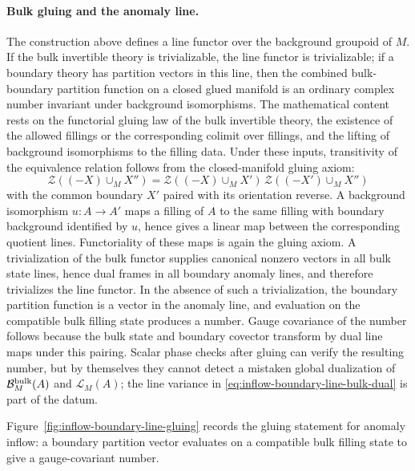 \paragraph{Bulk gluing and the anomaly line.}
The construction above defines a line functor over the background groupoid of
\(M\).  If the bulk invertible theory is trivializable, the line functor is
trivializable; if a boundary theory has partition vectors in this line, then
the combined bulk-boundary partition function on a closed glued manifold is
an ordinary complex number invariant under background isomorphisms.
The mathematical content rests on the functorial gluing law of the bulk
invertible theory, the existence of the allowed fillings or the corresponding
colimit over fillings, and the lifting of background isomorphisms to the
filling data.  Under these inputs, transitivity of the equivalence relation
follows from the closed-manifold
gluing axiom:
\[
  \mathcal Z((-X)\cup_M X'')=
  \mathcal Z((-X)\cup_M X')\,
  \mathcal Z((-X')\cup_M X'')
\]
with the common boundary \(X'\) paired with its orientation reverse.  A
background isomorphism \(u:A\to A'\) maps a filling of \(A\) to the same
filling with boundary background identified by \(u\), hence gives a linear
map between the corresponding quotient lines.  Functoriality of these maps is
again the gluing axiom.  A trivialization of the bulk functor supplies
canonical nonzero vectors in all bulk state lines, hence dual frames in all
boundary anomaly lines, and therefore trivializes the line
functor.  In the absence of such a trivialization, the boundary partition
function is a vector in the anomaly line, and evaluation on the compatible
bulk filling state produces a number.  Gauge covariance of the number follows
because the bulk state and boundary covector transform by dual line maps under
this pairing.  Scalar phase checks after gluing can verify the resulting
number, but by themselves they cannot detect a mistaken global dualization of
\(\mathcal B^{\rm bulk}_M(A)\) and \(\mathcal L_M(A)\); the line variance in
\eqref{eq:inflow-boundary-line-bulk-dual} is part of the datum.

Figure~\ref{fig:inflow-boundary-line-gluing} records the gluing statement for
anomaly inflow: a boundary partition vector evaluates on a compatible bulk
filling state to give a gauge-covariant number.

